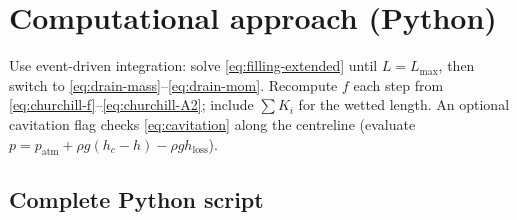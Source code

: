 \documentclass[11pt]{article}
\begin{document}
\section{Computational approach (Python)}
\label{sec:comp}
Use event-driven integration: solve \eqref{eq:filling-extended} until $L=L_{\max}$, then switch to \eqref{eq:drain-mass}--\eqref{eq:drain-mom}. Recompute $f$ each step from \eqref{eq:churchill-f}--\eqref{eq:churchill-A2}; include $\sum K_i$ for the wetted length. An optional cavitation flag checks \eqref{eq:cavitation} along the centreline (evaluate $p=p_{\mathrm{atm}}+\rho g(h_c-h)-\rho g h_{\text{loss}}$).

\subsection*{Complete Python script}
\end{document}

